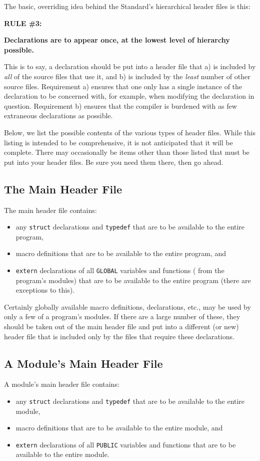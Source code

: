 The basic, overriding idea behind the Standard's hierarchical header
files is this:\vspace{.25 in}

{\bf RULE \#3:}

{\bf Declarations are to appear once, at the lowest level of hierarchy possible.}\vspace{.25 in}

This is to say, a declaration should be put into a header file that a)
is included by {\em all} of the source files that use it, and b) is
included by the {\em least} number of other source files.  Requirement
a) ensures that one only has a single instance of the declaration to
be concerned with, for example, when modifying the declaration in
question.  Requirement b) ensures that the compiler is burdened with
as few extraneous declarations as possible.

Below, we list the possible contents of the various types of header
files.  While this listing is intended to be comprehensive, it is not
anticipated that it will be complete.  There may occasionally be items
other than those listed that must be put into your header files.  Be
sure you need them there, then go ahead.

\subsection{The Main Header File}
The main header file contains:
\begin{itemize}
\item any {\tt struct} declarations and {\tt typedef} that are to be
available to the entire program,
\item macro definitions that are to be available to the entire program,  and

\item {\tt extern} declarations of all {\tt GLOBAL} variables and functions (
from the
program's modules) that are to be available to the entire program (there are
exceptions to this).
\end{itemize}

Certainly globally available macro definitions, declarations, etc.,
may be used by only a few of a program's modules.  If there are a
large number of these, they should be taken out of the main header
file and put into a different (or new) header file that is included
only by the files that require these declarations.

\subsection{A Module's Main Header File}
A module's  main header file contains:
\begin{itemize}
\item any {\tt struct} declarations and {\tt typedef} that are to be
available to the entire module,
\item macro definitions that are to be available to the entire module,  and

\item {\tt extern} declarations of all {\tt PUBLIC} variables and functions
that are to be available to the entire module.
\end{itemize}

